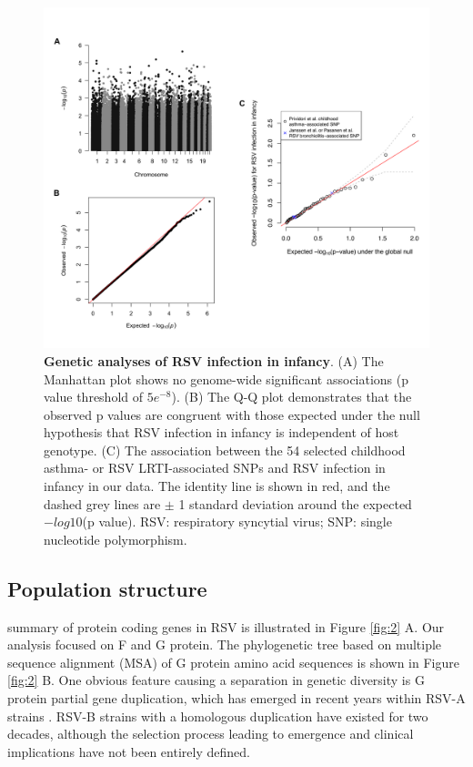 \documentclass{article} %
\begin{document}
\begin{figure}[ht] \hspace{-0.5cm}
\begin{center}
    \includegraphics[scale=0.07]{host_genetics}
\end{center} 
	\caption{\textbf{Genetic analyses of RSV infection in infancy}.
	(A) The Manhattan plot shows no genome-wide significant associations  (p value threshold of $5e^{-8}$). (B) The Q-Q plot demonstrates that the observed p values are congruent with those expected under the null hypothesis that RSV infection in infancy is independent of host genotype. (C) The association between the 54 selected childhood asthma- or RSV LRTI-associated SNPs and RSV infection in infancy in our data. The identity line is shown in red, and the dashed grey lines are $\pm$ 1 standard deviation around the expected $-log10$(p value). RSV: respiratory syncytial virus; SNP: single nucleotide polymorphism.
	}
	\label{fig:host_genetics} 
\end{figure}
\clearpage

\subsection{Population structure}
 summary of protein coding genes in RSV is illustrated in Figure \ref{fig:2} A. 
Our analysis focused on F and G protein. 
The phylogenetic tree based on multiple sequence alignment (MSA) of G protein amino acid sequences is shown in Figure \ref{fig:2} B. 
One obvious feature causing a separation in genetic diversity is G protein partial gene duplication, which has emerged in recent years within RSV-A strains \citep{eshaghi2012genetic}. 
RSV-B strains with a homologous duplication have existed for two decades, although the selection process leading to emergence and clinical implications have not been entirely defined. 
\end{document}
